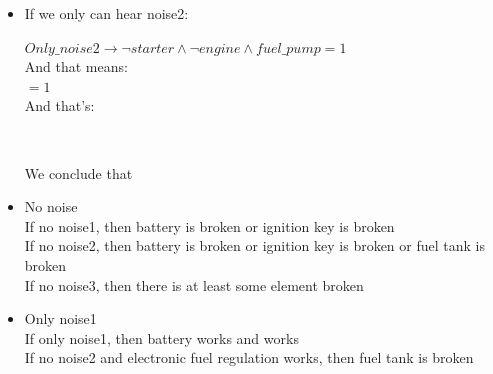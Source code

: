 \documentclass[paper=a4, fontsize=11pt]{scrartcl} %
\numberwithin{equation}{section} %
\numberwithin{figure}{section} %
\numberwithin{table}{section} %
\begin{document}
\begin{itemize}
\begin{itemize}
		And that means: \\
		
		$ (\lnot fuel\_pump \lor \lnot fuel\_tank \lor \lnot electronic\_fuel\_regulation \lor \lnot ignition\_key \lor \lnot battery) \land (\lnot engine \lor \lnot filter \lor \lnot fuel\_pump \lor \lnot fuel\_tank \lor \lnot electronic\_fuel\_regulation \lor \lnot ignition\_key \lor \lnot battery \lor \lnot starter \lor \lnot ignition\_key \lor \lnot battery) = 1$\\
		
		And that's:
		
		$  $
		
		We conclude that the battery, the ignition key and the starter are working, but the electronic fuel regulation or fuel pump are broken at least.
		
		
		
		
		
		
		\item If we only can hear noise2:
		
		$ Only\_noise2 \rightarrow  \lnot starter \land \lnot engine \land fuel\_pump = 1 $\\
		
		And that means: \\
		
		$  = 1$\\
		
		And that's:
		
		$  $
		
		We conclude that 
		
		
		
	\end{itemize}

	
		\begin{itemize}
			\item No noise\\
				If no noise1, then battery is broken or ignition key is broken\\
				If no noise2, then battery is broken or ignition key is broken or fuel tank is broken\\
				If no noise3, then there is at least some element broken\\
				
			\item Only noise1\\
				If only noise1, then battery works and works\\
				If no noise2 and electronic fuel regulation works, then fuel tank is broken\\
				

\end{itemize}
\end{itemize}
\end{document}
